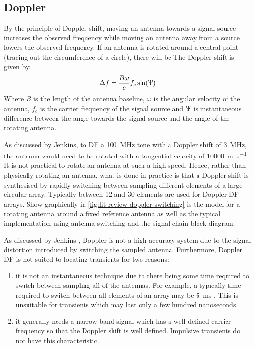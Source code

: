 \subsection{Doppler}
By the principle of Doppler shift, moving an antenna towards a signal source increases the observed frequency while moving an antenna away from a source lowers the observed frequency. 
If an antenna is rotated around a central point (tracing out the circumference of a circle), there will be 
The Doppler shift is given by: \cite{poisel2012electronic}
\begin{equation}
  \Delta f = \frac{B\omega}{c}f_c\sin(\Uppsi)
\end{equation}
Where \(B\) is the length of the antenna baseline, \(\omega\) is the angular velocity of the antenna, \(f_c\) is the carrier frequency of the signal source and \(\Uppsi\) is instantaneous difference between the angle towards the signal source and the angle of the rotating antenna. 

As discussed by Jenkins, to DF a \SI{100}{\mega\hertz} tone with a Doppler shift of \SI{3}{\mega\hertz}, the antenna would need to be rotated with a tangential velocity of \SI{10000}{\metre\per\second} \cite{jenkins1991smallaperture}. It is not practical to rotate an antenna at such a high speed. 
Hence, rather than physically rotating an antenna, what is done in practice is that a Doppler shift is synthesised by rapidly switching between sampling different elements of a large circular array. 
Typically between 12 and 30 elements are used for Doppler DF arrays. 
Show graphically in \autoref{fig:lit-review-doppler-switching} is the model for a rotating antenna around a fixed reference antenna as well as the typical implementation using antenna switching and the signal chain block diagram.

As discussed by Jenkins \cite{jenkins1991smallaperture}, Doppler is not a high accuracy system due to the signal distortion introduced by switching the sampled antenna. Furthermore, Doppler DF is not suited to locating transients for two reasons:
\begin{enumerate}
  \item it is not an instantaneous technique due to there being some time required to switch between sampling all of the antennas. For example, a typically time required to switch between all elements of an array may be \SI{6}{\milli\second} \cite{rhode2000introtodf}. This is unsuitable for transients which may last only a few hundred nanoseconds.
  \item it generally needs a narrow-band signal which has a well defined carrier frequency so that the Doppler shift is well defined. Impulsive transients do not have this characteristic.
\end{enumerate}

